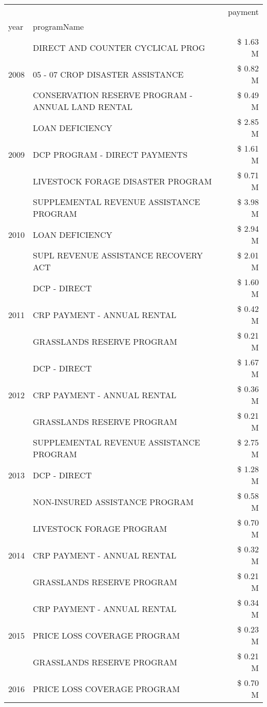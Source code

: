 \begin{tabular}{llr}
\toprule
 &  & payment \\
year & programName &  \\
\midrule
\multirow[t]{3}{*}{2008} & DIRECT AND COUNTER CYCLICAL PROG & \$ 1.63 M \\
 & 05 - 07 CROP DISASTER ASSISTANCE & \$ 0.82 M \\
 & CONSERVATION RESERVE PROGRAM - ANNUAL LAND RENTAL & \$ 0.49 M \\
\cline{1-3}
\multirow[t]{3}{*}{2009} & LOAN DEFICIENCY & \$ 2.85 M \\
 & DCP PROGRAM - DIRECT PAYMENTS & \$ 1.61 M \\
 & LIVESTOCK FORAGE DISASTER  PROGRAM & \$ 0.71 M \\
\cline{1-3}
\multirow[t]{3}{*}{2010} & SUPPLEMENTAL REVENUE ASSISTANCE PROGRAM & \$ 3.98 M \\
 & LOAN DEFICIENCY & \$ 2.94 M \\
 & SUPL REVENUE ASSISTANCE RECOVERY ACT & \$ 2.01 M \\
\cline{1-3}
\multirow[t]{3}{*}{2011} & DCP - DIRECT & \$ 1.60 M \\
 & CRP PAYMENT - ANNUAL RENTAL & \$ 0.42 M \\
 & GRASSLANDS RESERVE PROGRAM & \$ 0.21 M \\
\cline{1-3}
\multirow[t]{3}{*}{2012} & DCP - DIRECT & \$ 1.67 M \\
 & CRP PAYMENT - ANNUAL RENTAL & \$ 0.36 M \\
 & GRASSLANDS RESERVE PROGRAM & \$ 0.21 M \\
\cline{1-3}
\multirow[t]{3}{*}{2013} & SUPPLEMENTAL REVENUE ASSISTANCE PROGRAM & \$ 2.75 M \\
 & DCP - DIRECT & \$ 1.28 M \\
 & NON-INSURED ASSISTANCE PROGRAM & \$ 0.58 M \\
\cline{1-3}
\multirow[t]{3}{*}{2014} & LIVESTOCK FORAGE PROGRAM & \$ 0.70 M \\
 & CRP PAYMENT - ANNUAL RENTAL & \$ 0.32 M \\
 & GRASSLANDS RESERVE PROGRAM & \$ 0.21 M \\
\cline{1-3}
\multirow[t]{3}{*}{2015} & CRP PAYMENT - ANNUAL RENTAL & \$ 0.34 M \\
 & PRICE LOSS COVERAGE PROGRAM & \$ 0.23 M \\
 & GRASSLANDS RESERVE PROGRAM & \$ 0.21 M \\
\cline{1-3}
\multirow[t]{3}{*}{2016} & PRICE LOSS COVERAGE PROGRAM & \$ 0.70 M \\

\end{tabular}
